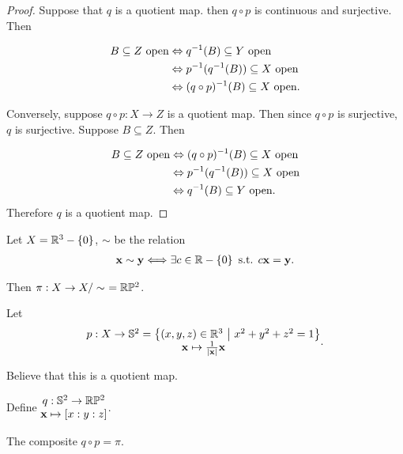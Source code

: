 \documentclass[12pt, twosided]{article}
\begin{document}
\begin{proof}
  Suppose that \(q\) is a quotient map. then \(q \circ p\) is continuous and surjective. Then 

  \begin{align*}
    B \subseteq Z \text{ open} &\Leftrightarrow q^{-1}(B) \subseteq Y \text{ open} \\
                        &\Leftrightarrow p^{-1}(q^{-1}(B)) \subseteq X \text{ open} \\
                        &\Leftrightarrow (q \circ p)^{-1} (B) \subseteq X \text{ open}.
  \end{align*}\partdone

  Conversely, suppose \(q \circ p: X \to Z\) is a quotient map. Then since \(q \circ p\) is surjective, \(q\) is surjective. Suppose \(B \subseteq Z\). Then

  \begin{align*}
    B \subseteq Z \text{ open} &\Leftrightarrow (q \circ p)^{-1}(B) \subseteq X \text{ open} \\
                        &\Leftrightarrow p^{-1}(q^{-1}(B)) \subseteq X \text{ open} \\
                        &\Leftrightarrow q^{-1}(B) \subseteq Y \text{ open}.                
  \end{align*}
  Therefore \(q\) is a quotient map.
\end{proof}

\begin{exa}
  Let \(X = \mathbb{R}^3 - \left\{ 0 \right\}\), \(\sim\) be the relation
  \begin{align*}
    \mathbf{x} \sim \mathbf{y} \Longleftrightarrow \exists c \in \mathbb{R} - \left\{ 0 \right\} \text{ s.t. } c\mathbf{x} = \mathbf{y}.
  \end{align*}

  Then \(\pi: X \to X/\sim\ = \mathbb{R}\mathbb{P}^2\).

  Let \[
  \begin{matrix}
    p: X \to \mathbb{S}^2 = \left\{ (x, y, z) \in \mathbb{R}^3 \ \middle\vert\  x^2 + y^2 + z^2 =1 \right\} \\ \mathbf{x} \mapsto \frac{1}{|\mathbf{x}|}\mathbf{x}
  \end{matrix}.
  \]

  Believe that this is a quotient map.

  Define \(
  \begin{matrix}
q : \mathbb{S}^2 \to \mathbb{R}\mathbb{P}^2 \\ \mathbf{x} \mapsto [x:y:z]
  \end{matrix}
  \).

  The composite \(q \circ p = \pi\).
\end{exa}
\end{document}
